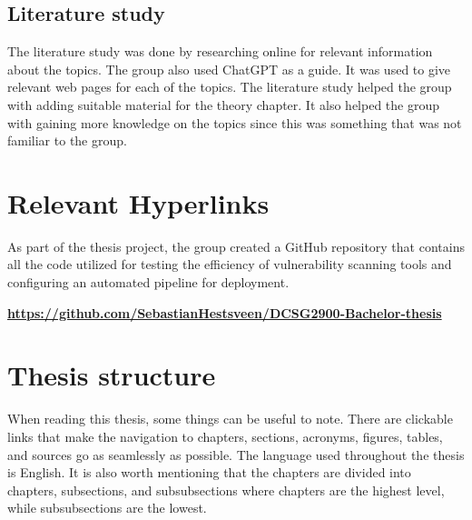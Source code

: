 \subsection{Literature study}
The literature study was done by researching online for relevant information about the topics. The group also used ChatGPT as a guide. It was used to give relevant web pages for each of the topics. The literature study helped the group with adding suitable material for the theory chapter. It also helped the group with gaining more knowledge on the topics since this was something that was not familiar to the group. 

\section{Relevant Hyperlinks}
As part of the thesis project, the group created a GitHub repository that contains all the code utilized for testing the efficiency of vulnerability scanning tools and configuring an automated pipeline for deployment. 

\href{https://github.com/SebastianHestsveen/DCSG2900-Bachelor-thesis}{\textbf{https://github.com/SebastianHestsveen/DCSG2900-Bachelor-thesis}}

\section{Thesis structure}
When reading this thesis, some things can be useful to note. There are clickable links that make the navigation to chapters, sections, acronyms, figures, tables, and sources go as seamlessly as possible. The language used throughout the thesis is English. It is also worth mentioning that the chapters are divided into chapters, subsections, and subsubsections where chapters are the highest level, while subsubsections are the lowest. 

